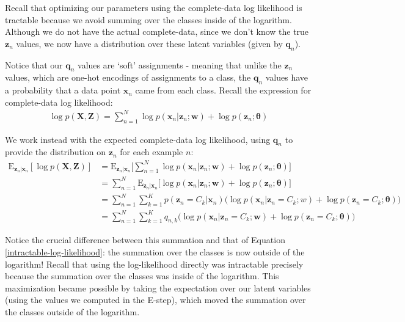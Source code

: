 Recall that optimizing our parameters using the complete-data log likelihood is tractable because we avoid summing over the classes inside of the logarithm. Although we do not have the actual complete-data, since we don't know the true $\textbf{z}_n$ values, we  now have a distribution over these latent variables (given by $\textbf{q}_n$).

Notice that our $\textbf{q}_n$ values are `soft' assignments - meaning that unlike the $\textbf{z}_n$ values, which are one-hot encodings of assignments to a class, the $\textbf{q}_n$ values have a probability that a data point $\textbf{x}_n$ came from each class.
Recall the expression for complete-data log likelihood:
%
\begin{align}
    \log p(\textbf{X}, \textbf{Z}) = \sum_{n=1}^{N} \log p(\textbf{x}_n | \textbf{z}_n; \textbf{w}) + \log p(\textbf{z}_n; \boldsymbol{\theta}) 
\end{align}


We work instead with the expected complete-data log likelihood, using $\textbf{q}_n$ to provide the distribution on
$\textbf{z}_n$ for each example $n$:
%
\begin{align} \label{tractable-eqn}
    \mathrm{E}_{\textbf{z}_n | \textbf{x}_n} [\log p(\textbf{X}, \textbf{Z})] &= \mathrm{E}_{\textbf{z}_n | \textbf{x}_n} \bigg[ \sum_{n=1}^{N} \log p(\textbf{x}_n | \textbf{z}_n; \textbf{w}) + \log p(\textbf{z}_n; \boldsymbol{\theta}) \bigg] \\
    &= \sum_{n=1}^{N} \mathrm{E}_{\textbf{z}_n | \textbf{x}_n} \bigg[ \log p(\textbf{x}_n | \textbf{z}_n ; \textbf{w}) + \log p(\textbf{z}_n ; \boldsymbol{\theta}) \bigg] \\
    &= \sum_{n=1}^{N} \sum_{k=1}^{K} p(\textbf{z}_n = C_k | \textbf{x}_n) \big( \log p(\textbf{x}_n | \textbf{z}_n = C_k; w) + \log p(\textbf{z}_n = C_k; \boldsymbol{\theta}) \big) \\
    &= \sum_{n=1}^{N} \sum_{k=1}^{K} q_{n, k} \big( \log p(\textbf{x}_n | \textbf{z}_n = C_k; \textbf{w}) + \log p(\textbf{z}_n = C_k; \boldsymbol{\theta}) \big) 
\end{align}

Notice the crucial difference between this summation and that of Equation \ref{intractable-log-likelihood}: the summation over the classes is now outside of the logarithm! Recall that using the log-likelihood directly was intractable precisely because the summation over the classes was inside of the logarithm. This maximization became possible by taking the expectation over our latent variables (using the values we computed in the E-step), which moved the summation over the classes outside of the logarithm.

